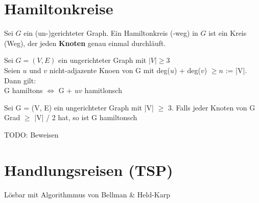 \documentclass[14pt]{article}
\begin{document}
    \section{Hamiltonkreise}
    \begin{definition}
        Sei $G$ ein (un-)gerichteter Graph. Ein Hamiltonkreis (-weg)
        in $G$ ist ein Kreis (Weg), der jeden \textbf{Knoten} genau
        einmal durchläuft.
    \end{definition}
    \begin{eigenschaft}
        Sei $G = (V, E)$ ein ungerichteter Graph mit $|V| \geq 3$ \\
        Seien $u$ und $v$ nicht-adjazente Knoen von G mit deg($u$)
        + deg($v$) $\geq n$ := |V|. Dann gilt: \\
        \indent G hamiltons $\Leftrightarrow$ G + $uv$ hamitlonsch 
    \end{eigenschaft}
    \begin{eigenschaft}
        Sei G = (V, E) ein ungerichteter Graph mit |V| $\geq$ 3.
        Falls jeder Knoten von G Grad $\geq$ |V| / 2 hat, so ist 
        G hamiltonsch
    \end{eigenschaft}
    TODO: Beweisen

    \section{Handlungsreisen (TSP)}
    Lösbar mit Algorithmmus von Bellman \& Held-Karp
\end{document}
